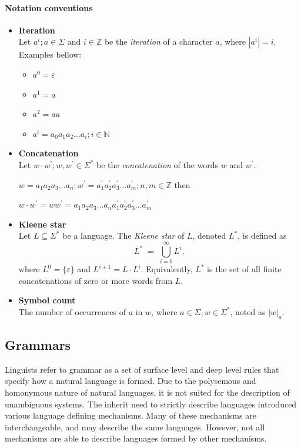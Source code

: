 \paragraph*{Notation conventions}



\begin{itemize}
\item \textbf{Iteration}\\
  Let $a^i; a \in \Sigma \text{ and } i \in \mathbb{Z}$ be the \emph{iteration} of a character $a$, where $|a^i| = i$.\\
Examples bellow:


\begin{itemize}
\item $a^0 = \varepsilon$
\item $a^1 = a$
\item $a^2 = aa$
\item $a^i = a_0 a_1 a_2 \dots a_i; i \in \mathbb{N}$
\end{itemize}


\item \textbf{Concatenation}\\
  Let $w \cdot w^{'}; w, w^{'} \in \Sigma^{*}$ be the \emph{concatenation} of the words $w$ and $w^{'}$.

$w = a_1 a_2 a_3 \dots a_n ; w^{'} = a^{'}_1 a^{'}_2 a^{'}_3 \dots a^{'}_m; n,m \in \mathbb{Z}$ then  

$w\cdot w^{'} = w w^{'} = a_1 a_2 a_3 \dots a_n a^{'}_1 a^{'}_2 a^{'}_3 \dots a^{'}_m$


\item \textbf{Kleene star}\\
  Let $L \subseteq \Sigma^{*}$ be a language. The \emph{Kleene star} of $L$, denoted $L^{*}$, is defined as
  \[
    L^{*} \;=\; \bigcup_{i=0}^{\infty} L^{i},
  \]
  where $L^{0} = \{\varepsilon\}$ and $L^{i+1} = L \cdot L^{i}$.  Equivalently, $L^{*}$ is the set of all finite concatenations of zero or more words from $L$.\\

\item \textbf{Symbol count}\\
The number of occurrences of $a$ in $w$, where $a \in \Sigma, w \in \Sigma^{*}$, noted as $|w|_{a}$.

\end{itemize}

\subsection{Grammars}
Linguists refer to grammar as a set of surface level and deep level rules that specify how a natural language is formed. Due to the polysemous and homonymous nature of natural languages, it is not suited for the description of unambiguous systems. The inherit need to strictly describe languages introduced various language defining mechanisms. Many of these mechanisms are interchangeable, and may describe the same languages. However, not all mechanisms are able to describe languages formed by other mechanisms.


